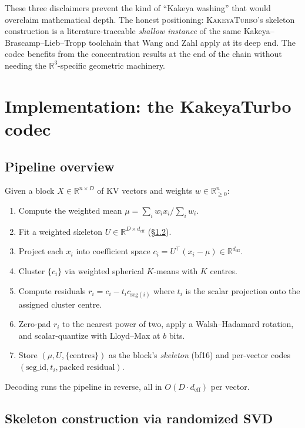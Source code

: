 \documentclass[11pt,a4paper]{article}
\theoremstyle{definition}
\theoremstyle{plain}
\newcommand{\R}{\mathbb{R}}
\begin{document}
These three disclaimers prevent the kind of ``Kakeya washing'' that would overclaim mathematical depth. The honest positioning: \textsc{KakeyaTurbo}'s skeleton construction is a literature-traceable \emph{shallow instance} of the same Kakeya--Brascamp--Lieb--Tropp toolchain that Wang and Zahl apply at its deep end. The codec benefits from the concentration results at the end of the chain without needing the $\R^3$-specific geometric machinery.

\section{Implementation: the KakeyaTurbo codec}
\label{sec:implementation}

\subsection{Pipeline overview}
Given a block $X \in \R^{n \times D}$ of KV vectors and weights $w \in \R_{\geq 0}^n$:
\begin{enumerate}[leftmargin=*]
  \item Compute the weighted mean $\mu = \sum_i w_i x_i / \sum_i w_i$.
  \item Fit a weighted skeleton $U \in \R^{D \times d_{\text{eff}}}$ (\S\ref{sec:skeleton}).
  \item Project each $x_i$ into coefficient space $c_i = U^\top (x_i - \mu) \in \R^{d_{\text{eff}}}$.
  \item Cluster $\{c_i\}$ via weighted spherical $K$-means with $K$ centres.
  \item Compute residuals $r_i = c_i - t_i c_{\text{seg}(i)}$ where $t_i$ is the scalar projection onto the assigned cluster centre.
  \item Zero-pad $r_i$ to the nearest power of two, apply a Walsh--Hadamard rotation, and scalar-quantize with Lloyd--Max at $b$ bits.
  \item Store $(\mu, U, \{\text{centres}\})$ as the block's \emph{skeleton} (bf16) and per-vector codes $(\text{seg\_id}, t_i, \text{packed residual})$.
\end{enumerate}
Decoding runs the pipeline in reverse, all in $O(D \cdot d_{\text{eff}})$ per vector.

\subsection{Skeleton construction via randomized SVD}
\label{sec:skeleton}
\end{document}
